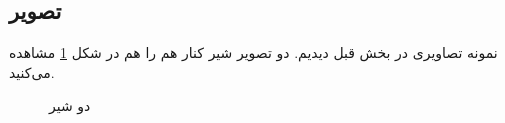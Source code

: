 \subsection{تصویر}
نمونه تصاویری در بخش قبل دیدیم. دو تصویر شیر کنار هم را هم در شکل \ref{fig:twolion} مشاهده می‌کنید.
\begin{figure}[t]
	\centering 
	\caption{دو شیر}
	\label{fig:twolion} %
\end{figure}